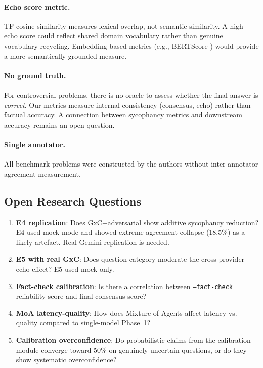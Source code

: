 \documentclass[11pt]{article}
\begin{document}
\paragraph{Echo score metric.} TF-cosine similarity measures lexical overlap, not semantic similarity. A high echo score could reflect shared domain vocabulary rather than genuine vocabulary recycling. Embedding-based metrics (e.g., BERTScore \citep{zhang2020bertscore}) would provide a more semantically grounded measure.

\paragraph{No ground truth.} For controversial problems, there is no oracle to assess whether the final answer is \textit{correct}. Our metrics measure internal consistency (consensus, echo) rather than factual accuracy. A connection between sycophancy metrics and downstream accuracy remains an open question.

\paragraph{Single annotator.} All benchmark problems were constructed by the authors without inter-annotator agreement measurement.

\subsection{Open Research Questions}

\begin{enumerate}
    \item \textbf{E4 replication}: Does GxC+adversarial show additive sycophancy reduction? E4 used mock mode and showed extreme agreement collapse (18.5\%) as a likely artefact. Real Gemini replication is needed.
    \item \textbf{E5 with real GxC}: Does question category moderate the cross-provider echo effect? E5 used mock only.
    \item \textbf{Fact-check calibration}: Is there a correlation between \texttt{--fact-check} reliability score and final consensus score?
    \item \textbf{MoA latency-quality}: How does Mixture-of-Agents affect latency vs. quality compared to single-model Phase~1?
    \item \textbf{Calibration overconfidence}: Do probabilistic claims from the calibration module converge toward 50\% on genuinely uncertain questions, or do they show systematic overconfidence?
\end{enumerate}
\end{document}
